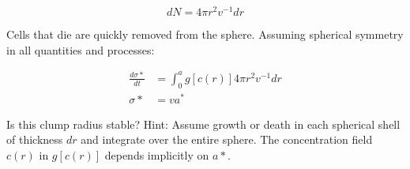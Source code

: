 \documentclass{article}
\begin{document}
\[dN = 4\pi r^2v^{-1}dr\]

Cells that die are quickly removed from the sphere. Assuming spherical symmetry in all quantities and processes:

\begin{align*}
\frac{d\sigma*}{dt} &= \int_0^a g[c(r)] 4\pi r^2 v^{-1}dr \\
\sigma* &= va^*
\end{align*}

Is this clump radius stable? Hint: Assume growth or death in each spherical shell of thickness $dr$ and integrate over the entire sphere. The concentration field $c(r)$ in $g[c(r)]$ depends implicitly on $a*$.
\end{document}
